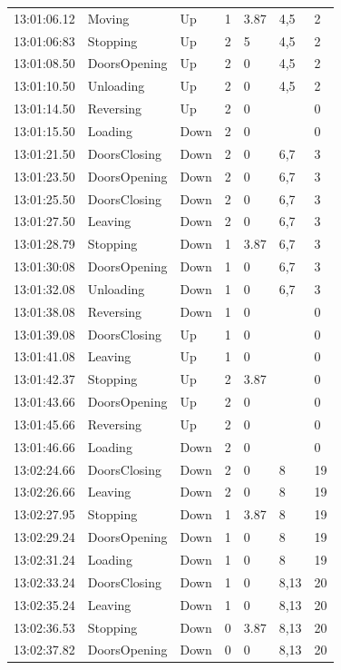 \documentclass{UoYCSproject}
\begin{document}
\begin{appendices}
\begin{longtable}{l | l | l | l | l | l | l}
	13:01:06.12 & Moving & Up & 1 & 3.87 & 4,5 & 2 \\
	13:01:06:83 & Stopping & Up & 2 & 5 & 4,5 & 2 \\
	13:01:08.50 & DoorsOpening & Up & 2 & 0 & 4,5 & 2 \\
	13:01:10.50 & Unloading & Up & 2 & 0 & 4,5 & 2 \\
	13:01:14.50 & Reversing & Up & 2 & 0 &  & 0 \\
	13:01:15.50 & Loading & Down & 2 & 0 &  & 0 \\
	13:01:21.50 & DoorsClosing & Down & 2 & 0 & 6,7 & 3 \\
	13:01:23.50 & DoorsOpening & Down & 2 & 0 & 6,7 & 3 \\
	13:01:25.50 & DoorsClosing & Down & 2 & 0 & 6,7 & 3 \\
	13:01:27.50 & Leaving & Down & 2 & 0 & 6,7 & 3 \\
	13:01:28.79 & Stopping & Down & 1 & 3.87 & 6,7 & 3 \\
	13:01:30:08 & DoorsOpening & Down & 1 & 0 & 6,7 & 3 \\
	13:01:32.08 & Unloading & Down & 1 & 0 & 6,7 & 3 \\
	13:01:38.08 & Reversing & Down & 1 & 0 &  & 0 \\
	13:01:39.08 & DoorsClosing & Up & 1 & 0 &  & 0 \\
	13:01:41.08 & Leaving & Up & 1 & 0 &  & 0 \\
	13:01:42.37 & Stopping & Up & 2 & 3.87 &  & 0 \\
	13:01:43.66 & DoorsOpening & Up & 2 & 0 &  & 0 \\
	13:01:45.66 & Reversing & Up & 2 & 0 &  & 0 \\
	13:01:46.66 & Loading & Down & 2 & 0 &  & 0 \\
	13:02:24.66 & DoorsClosing & Down & 2 & 0 & 8 & 19 \\
	13:02:26.66 & Leaving & Down & 2 & 0 & 8 & 19 \\
	13:02:27.95 & Stopping & Down & 1 & 3.87 & 8 & 19 \\
	13:02:29.24 & DoorsOpening & Down & 1 & 0 & 8 & 19 \\
	13:02:31.24 & Loading & Down & 1 & 0 & 8 & 19 \\
	13:02:33.24 & DoorsClosing & Down & 1 & 0 & 8,13 & 20 \\
	13:02:35.24 & Leaving & Down & 1 & 0 & 8,13 & 20 \\
	13:02:36.53 & Stopping & Down & 0 & 3.87 & 8,13 & 20 \\
	13:02:37.82 & DoorsOpening & Down & 0 & 0 & 8,13 & 20 \\

\end{longtable}
\end{appendices}
\end{document}

